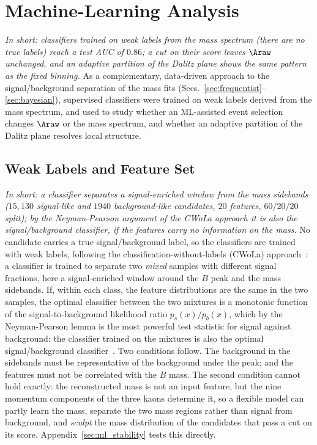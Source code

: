\section{Machine-Learning Analysis}
\label{sec:ml}
\emph{In short: classifiers trained on weak labels from the mass spectrum (there are no true labels) reach a test AUC of $0.86$; a cut on their score leaves $\Araw$ unchanged, and an adaptive partition of the Dalitz plane shows the same pattern as the fixed binning.}
As a complementary, data-driven approach to the signal/background separation of the mass fits (Secs.~\ref{sec:frequentist}--\ref{sec:bayesian}), supervised classifiers were trained on weak labels derived from the mass spectrum, and used to study whether an ML-assisted event selection changes $\Araw$ or the mass spectrum, and whether an adaptive partition of the Dalitz plane resolves local structure.

\subsection{Weak Labels and Feature Set}
\label{sec:ml_labels}
\emph{In short: a classifier separates a signal-enriched window from the mass sidebands ($15{,}130$ signal-like and $1940$ background-like candidates, $20$ features, $60/20/20$ split); by the Neyman-Pearson argument of the CWoLa approach it is also the signal/background classifier, if the features carry no information on the mass.}
No candidate carries a true signal/background label, so the classifiers are trained with weak labels, following the classification-without-labels (CWoLa) approach~\cite{cwola}: a classifier is trained to separate two \emph{mixed} samples with different signal fractions, here a signal-enriched window around the $B$ peak and the mass sidebands. If, within each class, the feature distributions are the same in the two samples, the optimal classifier between the two mixtures is a monotonic function of the signal-to-background likelihood ratio $p_s(x)/p_b(x)$, which by the Neyman-Pearson lemma is the most powerful test statistic for signal against background: the classifier trained on the mixtures is also the optimal signal/background classifier~\cite{cwola}. Two conditions follow. The background in the sidebands must be representative of the background under the peak; and the features must not be correlated with the $B$ mass. The second condition cannot hold exactly: the reconstructed mass is not an input feature, but the nine momentum components of the three kaons determine it, so a flexible model can partly learn the mass, separate the two mass regions rather than signal from background, and \emph{sculpt} the mass distribution of the candidates that pass a cut on its score. Appendix~\ref{sec:ml_stability} tests this directly.

